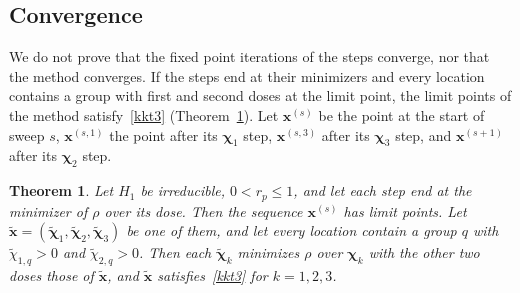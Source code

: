 \documentclass[11pt]{article}
\theoremstyle{plain}
\newtheorem{theorem}{Theorem}[section]
\theoremstyle{remark}
\numberwithin{equation}{section}
\begin{document}
\subsection{Convergence}\label{sec-alt-convergence}
We do not prove that the fixed point iterations of the steps converge, nor
that the method converges. If the steps end at their minimizers and every location contains a group
with first and second doses at the limit point, the limit points of the
method satisfy~\eqref{kkt3} (Theorem~\ref{alt-limit}). Let $\bm x^{(s)}$ be the point at the start of
sweep $s$, $\bm x^{(s,1)}$ the point after its $\bm\chi_1$ step, $\bm x^{(s,3)}$
after its $\bm\chi_3$ step, and $\bm x^{(s+1)}$ after its $\bm\chi_2$ step.

\begin{theorem}\label{alt-limit}
Let $H_1$ be irreducible, $0<r_p\le 1$, and let each step end at the minimizer
of $\rho$ over its dose. Then the sequence $\bm x^{(s)}$ has limit points. Let
$\widetilde{\bm x}=(\widetilde{\bm\chi}_1,\widetilde{\bm\chi}_2,\widetilde{\bm\chi}_3)$ be one of them,
and let every location contain a group $q$ with $\widetilde\chi_{1,q}>0$ and
$\widetilde\chi_{2,q}>0$. Then each $\widetilde{\bm\chi}_k$ minimizes $\rho$ over
$\bm\chi_k$ with the other two doses those of $\widetilde{\bm x}$, and $\widetilde{\bm x}$
satisfies~\eqref{kkt3} for $k=1,2,3$.
\end{theorem}
\end{document}
